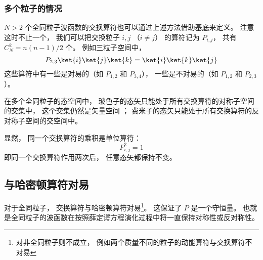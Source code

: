 \subsubsection{多个粒子的情况}
$N > 2$ 个全同粒子波函数的交换算符也可以通过上述方法借助基底来定义。 注意这时不止一个， 我们可以把交换粒子 $i,j$ （$i\ne j$） 的算符记为 $P_{i,j}$， 共有 $C_N^2 = n(n-1)/2$ 个。 例如三粒子空间中，
\begin{equation}
P_{2,3} \ket{i}\ket{j}\ket{k} = \ket{i}\ket{k}\ket{j}
\end{equation}
这些算符中有一些是对易的（如 $P_{1,2}$ 和 $P_{3,4}$）， 一些是不对易的（如 $P_{1,2}$ 和 $P_{2,3}$）。

在多个全同粒子的态空间中， 玻色子的态矢只能处于所有交换算符的对称子空间的交集中， 这个交集仍然是矢量空间%
； 费米子的态矢只能处于所有交换算符的反对称子空间的交空间中。

显然， 同一个交换算符的乘积是单位算符：
\begin{equation}\label{eq_ExchOp_7}
P_{i,j}^2 = 1
\end{equation}
即同一个交换算符作用两次后， 任意态矢都保持不变。

\subsection{与哈密顿算符对易}

对于全同粒子， 交换算符与哈密顿算符对易\footnote{对非全同粒子则不成立， 例如两个质量不同的粒子的动能算符与交换算符不对易}。 这保证了 $P$ 是一个守恒量。 也就是全同粒子的波函数在按照薛定谔方程演化过程中将一直保持对称性或反对称性。





